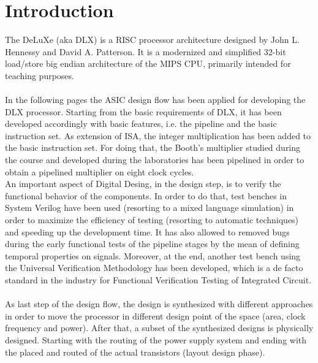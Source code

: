 \chapter{Introduction}
\label{Introduction}
The DeLuXe (aka DLX) is a RISC processor architecture designed by John L. Hennessy and David A. Patterson. It is a modernized and simplified 32-bit load/store big endian architecture of the MIPS CPU, primarily intended for teaching purposes.\\\\
In the following pages the ASIC design flow has been applied for developing the DLX processor. Starting from the basic requirements of DLX, it has been developed accordingly with basic features, i.e. the pipeline and the basic instruction set.
As extension of ISA, the integer multiplication has been added to the basic instruction set. For doing that, the Booth's multiplier studied during the course and developed during the laboratories has been pipelined in order to obtain a pipelined multiplier on eight clock cycles.\\
An important aspect of Digital Desing, in the design step, is to verify the functional behavior of the components. In order to do that, test benches in System Verilog have been used (resorting to a mixed language simulation) in order to maximize the efficiency of testing (resorting to automatic techniques) and speeding up the development time. It has also allowed to removed bugs during the early functional tests of the pipeline stages by the mean of defining temporal properties on signals.
Moreover, at the end, another test bench using the Universal Verification Methodology has been developed, which is a de facto standard in the industry for Functional Verification Testing of Integrated Circuit\cite{website:1}.\\\\
As last step of the design flow, the design is synthesized with different approaches in order to move the processor in different design point of the space (area, clock frequency and power). After that, a subset of the synthesized designs is physically designed. Starting with the routing of the power supply system and ending with the placed and routed of the actual transistors (layout design phase).